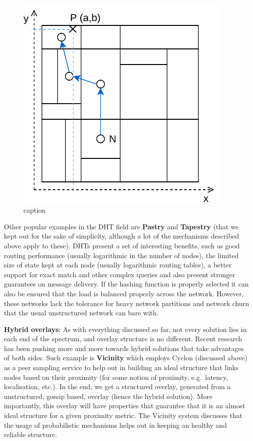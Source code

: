 \begin{figure}[hb!]
  \centering
  \includegraphics[width=0.95\textwidth]{img/can.png}
  \caption{caption}
  \label{fig:can}
\end{figure}

Other popular examples in the DHT field are \textbf{Pastry} \cite{Rowstron2001} and
\textbf{Tapestry} \cite{Zhao2006} (that we kept out for the sake of simplicity, although
a lot of the mechanisms described above apply to these). DHTs present a
set of interesting benefits, such as good routing performance (usually
logarithmic in the number of nodes), the limited size of state kept at
each node (usually logarithmic routing tables), a better support for
exact match and other complex queries and also present stronger
guarantees on message delivery. If the hashing function is properly
selected it can also be ensured that the load is balanced properly
across the network. However, these networks lack the tolerance for heavy
network partitions and network churn that the usual unstructured network
can bare with.
\bigskip

\textbf{Hybrid overlays}: As with everything discussed so far, not every
solution lies in each end of the spectrum, and overlay structure is no
different. Recent research has been pushing more and more towards hybrid
solutions that take advantages of both sides. Such example is
\textbf{Vicinity} \cite{Voulgaris2013} which employs Cyclon
(discussed above) as a peer sampling service to help out in building an
ideal structure that links nodes based on their proximity (for some
notion of proximity, e.g.~latency, localisation, etc.). In the end, we
get a structured overlay, generated from a unstructured, gossip based,
overlay (hence the hybrid solution). More importantly, this overlay will
have properties that guarantee that it is an almost ideal structure for
a given proximity metric. The Vicinity system discusses that the usage
of probabilistic mechanisms helps out in keeping an healthy and reliable
structure.

